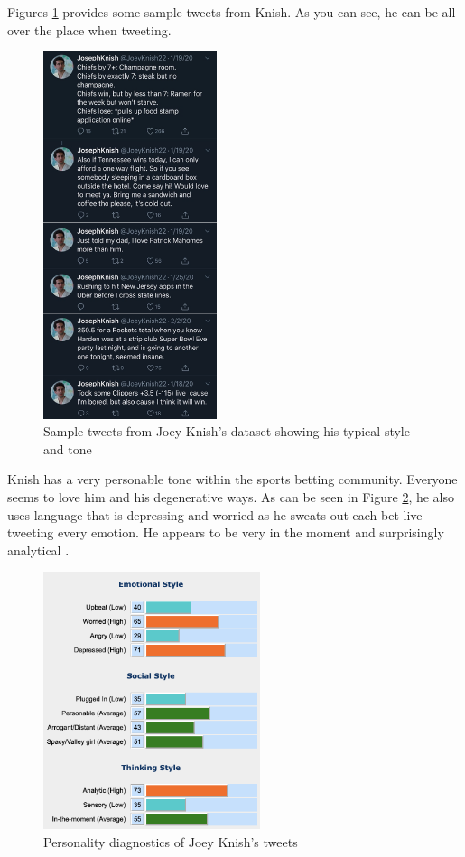 \documentclass[5p,authoryear]{elsarticle}
\begin{document}
Figures \ref{tweet knish} provides some sample tweets from Knish. As you can see, he can be all over the place when tweeting.

\begin{figure}[!htb] \centering
	\includegraphics[width=2.0in]{figures/tweet_knish.png}
	\caption[]{Sample tweets from Joey Knish's dataset showing his typical style and tone} 
	\label{tweet knish} 
\end{figure}

Knish has a very personable tone within the sports betting community. Everyone seems to love him and his degenerative ways. As can be seen in Figure \ref{knish_personality}, he also uses language that is depressing and worried as he sweats out each bet live tweeting every emotion. He appears to be very in the moment and surprisingly analytical \citep{Anal_words}. 

\begin{figure}[!htb] \centering
	\includegraphics[width=2.5in]{figures/personality_Knish.png}
	\caption[]{Personality diagnostics of Joey Knish’s tweets} 
	\label{knish_personality} 
\end{figure}
\end{document}
